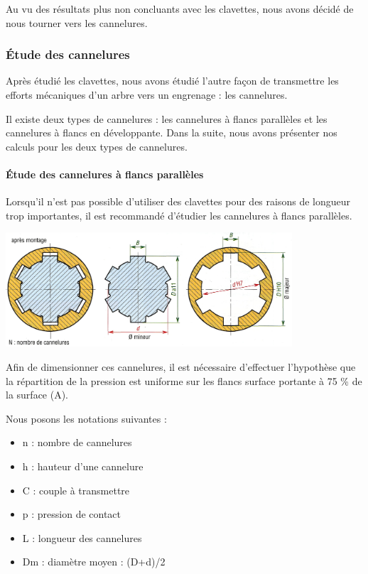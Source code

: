 \documentclass{config}
\begin{document}
\begin{spacing}{1.2}
Au vu des résultats plus non concluants avec les clavettes, nous avons décidé de nous tourner vers les cannelures.

\subsubsection{Étude des cannelures}
Après étudié les clavettes, nous avons étudié l'autre façon de transmettre les efforts mécaniques d'un arbre vers un engrenage : les cannelures.


Il existe deux types de cannelures : les cannelures à flancs parallèles et les cannelures à flancs en développante.
Dans la suite, nous avons présenter nos calculs pour les deux types de cannelures.

\paragraph{Étude des cannelures à flancs parallèles}

Lorsqu'il n'est pas possible d'utiliser des clavettes pour des raisons de longueur trop importantes, il est recommandé d'étudier les cannelures à flancs parallèles.

\begin{center}
\includegraphics[width=0.8\textwidth]{cannelure_parallele.jpg}
\end{center}

Afin de dimensionner ces cannelures, il est nécessaire d'effectuer l'hypothèse que la répartition de la pression est uniforme sur les flancs surface portante à 75 \% de la surface (A).

Nous posons les notations suivantes :
\begin{itemize}
\item n : nombre de cannelures
\item h : hauteur d'une cannelure
\item C : couple à transmettre
\item p : pression de contact
\item L : longueur des cannelures
\item Dm : diamètre moyen : (D+d)/2
\end{itemize}


\end{spacing}
\end{document}

